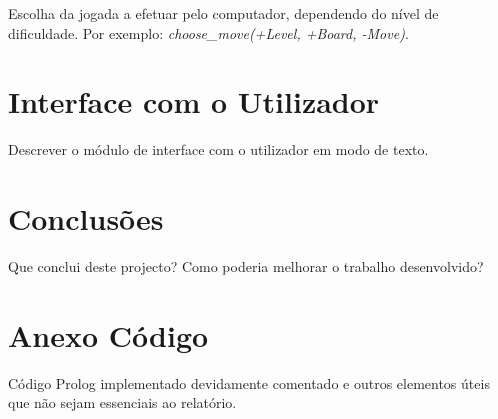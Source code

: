 \documentclass[a4paper]{article}
\begin{document}
Escolha da jogada a efetuar pelo computador, dependendo do nível de dificuldade. Por exemplo: \textit{choose\_move(+Level, +Board, -Move)}.


\newpage
\section{Interface com o Utilizador}








Descrever o módulo de interface com o utilizador em modo de texto.


\section{Conclusões}
Que conclui deste projecto? Como poderia melhorar o trabalho desenvolvido?


\clearpage
{}
\renewcommand\refname{Bibliografia}



\newpage
\appendix
\section{Anexo Código}
Código Prolog implementado devidamente comentado e outros elementos úteis que não sejam essenciais ao relatório.
\end{document}
